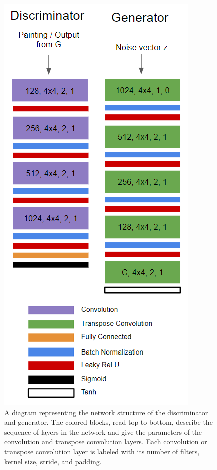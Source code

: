 \documentclass[10pt,twocolumn,letterpaper]{article}
\begin{document}
\begin{figure}[t]
	\begin{center}
		\includegraphics[width=0.9\linewidth]{nets1.png}
	\end{center}
	\caption{A diagram representing the network structure of the discriminator and generator. The colored blocks, read top to bottom, describe the sequence of layers in the network and give the parameters of the convolution and transpose convolution layers. Each convolution or transpose convolution layer is labeled with its number of filters, kernel size, stride, and padding.}
	\label{fig:long}
	\label{fig:onecol}
\end{figure}
\end{document}
